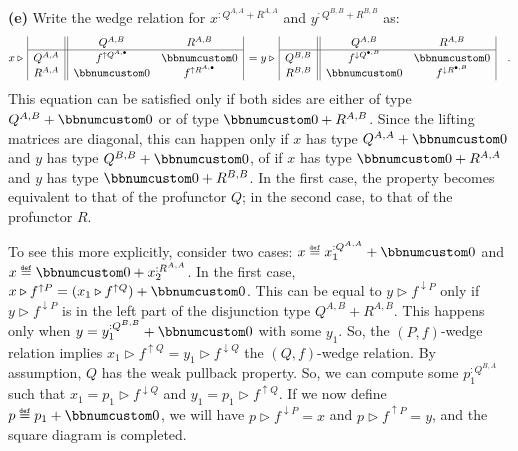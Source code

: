 \textbf{(e)} Write the wedge relation for $x^{:Q^{A,A}+R^{A,A}}$
and $y^{:Q^{B,B}+R^{B,B}}$ as:
\[
x\triangleright\,\begin{array}{|c||cc|}
 & Q^{A,B} & R^{A,B}\\
\hline Q^{A,A} & f^{\uparrow Q^{A,\bullet}} & \bbnum 0\\
R^{A,A} & \bbnum 0 & f^{\uparrow R^{A,\bullet}}
\end{array}\,=y\triangleright\,\begin{array}{|c||cc|}
 & Q^{A,B} & R^{A,B}\\
\hline Q^{B,B} & f^{\downarrow Q^{\bullet,B}} & \bbnum 0\\
R^{B,B} & \bbnum 0 & f^{\downarrow R^{\bullet,B}}
\end{array}\quad.
\]
This equation can be satisfied only if both sides are either of type
$Q^{A,B}+\bbnum 0$ or of type $\bbnum 0+R^{A,B}$. Since the lifting
matrices are diagonal, this can happen only if $x$ has type $Q^{A,A}+\bbnum 0$
and $y$ has type $Q^{B,B}+\bbnum 0$, of if $x$ has type $\bbnum 0+R^{A,A}$
and $y$ has type $\bbnum 0+R^{B,B}$. In the first case, the property
becomes equivalent to that of the profunctor $Q$; in the second case,
to that of the profunctor $R$.

To see this more explicitly, consider two cases: $x\triangleq x_{1}^{:Q^{A,A}}+\bbnum 0$
and $x\triangleq\bbnum 0+x_{2}^{:R^{A,A}}$. In the first case, $x\triangleright f^{\uparrow P}=(x_{1}\triangleright f^{\uparrow Q})+\bbnum 0$.
This can be equal to $y\triangleright f^{\downarrow P}$ only if $y\triangleright f^{\downarrow P}$
is in the left part of the disjunction type $Q^{A,B}+R^{A,B}$. This
happens only when $y=y_{1}^{:Q^{B,B}}+\bbnum 0$ with some $y_{1}$.
So, the $\left(P,f\right)$-wedge relation implies $x_{1}\triangleright f^{\uparrow Q}=y_{1}\triangleright f^{\downarrow Q}$
\textemdash{} the $\left(Q,f\right)$-wedge relation. By assumption,
$Q$ has the weak pullback property. So, we can compute some $p_{1}^{:Q^{B,A}}$
such that $x_{1}=p_{1}\triangleright f^{\downarrow Q}$ and $y_{1}=p_{1}\triangleright f^{\uparrow Q}$.
If we now define $p\triangleq p_{1}+\bbnum 0$, we will have $p\triangleright f^{\downarrow P}=x$
and $p\triangleright f^{\uparrow P}=y$, and the square diagram is
completed.

